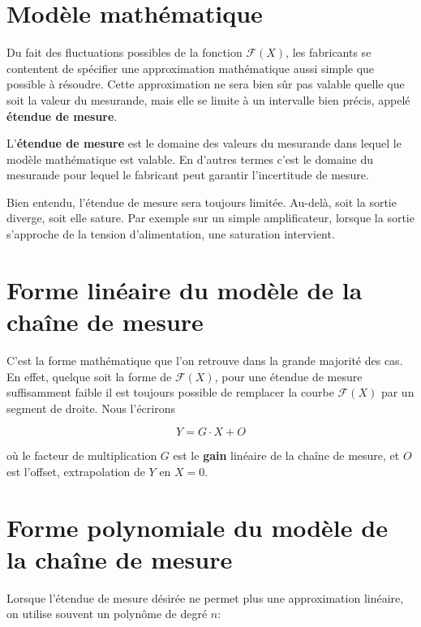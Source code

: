 \section{Modèle mathématique}

Du fait des fluctuations possibles de la fonction $\mathcal{F}(X)$, les fabricants se contentent de spécifier une approximation mathématique aussi simple que possible à résoudre. Cette approximation ne sera bien sûr pas valable quelle que soit la valeur du mesurande, mais elle se limite à un intervalle bien précis, appelé \textbf{étendue de mesure}.

\begin{definition}
    L'\textbf{étendue de mesure} est le domaine des valeurs du mesurande dans lequel le modèle mathématique est valable. En d'autres termes c'est le domaine du mesurande pour lequel le fabricant peut garantir l'incertitude de mesure.
\end{definition}

Bien entendu, l'étendue de mesure sera toujours limitée. Au-delà, soit la sortie diverge, soit elle sature. Par exemple sur un simple amplificateur, lorsque la sortie s'approche de la tension d'alimentation, une saturation intervient.

\section{Forme linéaire du modèle de la chaîne de mesure}

C'est la forme mathématique que l'on retrouve dans la grande majorité des cas. En effet, quelque soit la forme de $\mathcal{F}(X)$, pour une étendue de mesure suffisamment faible il est toujours possible de remplacer la courbe $\mathcal{F}(X)$ par un segment de droite. Nous l'écrirons

\begin{equation}
    Y = G\cdot X + O
\end{equation}

où le facteur de multiplication $G$ est le \textbf{gain} linéaire de la chaîne de mesure, et $O$ est l'offset, extrapolation de $Y$ en $X=0$.

\section{Forme polynomiale du modèle de la chaîne de mesure}

Lorsque l'étendue de mesure désirée ne permet plus une approximation linéaire, on utilise souvent un polynôme de degré $n$:

